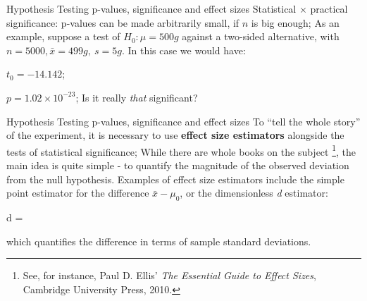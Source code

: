 \documentclass[t]{beamer}
\begin{document}

\begin{ftst}
{Hypothesis Testing}
{p-values, significance and effect sizes}
Statistical $\times$ practical significance: p-values can be made arbitrarily small, if $n$ is big enough;
\vone 
As an example, suppose a test of $H_0: \mu=500g$ against a two-sided alternative, with $n=5000, \bar{x}=499g,\ s=5g$. In this case we would have:

\bitems $t_0 = -14.142$;
\item $p = 1.02\times 10^{-23}$;\eitem
\vone	
Is it really \textit{that} significant?
\end{ftst}


\begin{ftst}
{Hypothesis Testing}
{p-values, significance and effect sizes}
To ``tell the whole story'' of the experiment, it is necessary to use \textbf{effect size estimators} alongside the tests of statistical significance; 
\vone
While there are whole books on the subject \footnote[3]{\tiny See, for instance, Paul D. Ellis' \textit{The Essential Guide to Effect Sizes}, Cambridge University Press, 2010.}, the main idea is quite simple - to quantify the magnitude of the observed deviation from the null hypothesis.
\vone
Examples of effect size estimators include the simple point estimator for the difference $\bar{x} - \mu_0$, or the dimensionless \textit{d} estimator:

\beqs
d = 
\eqs

\noindent which quantifies the difference in terms of sample standard deviations.
\vone
\end{ftst}

\end{document}
